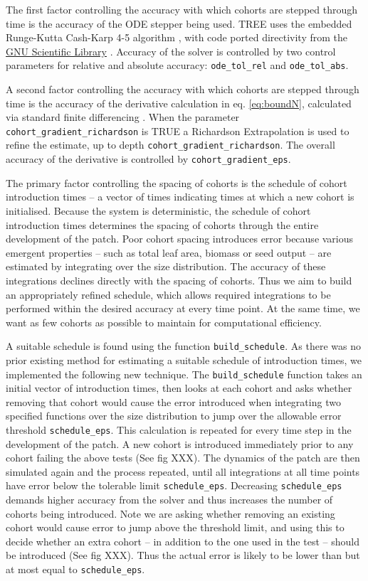 \documentclass[10pt,twoside]{article}
\begin{document}
The first factor controlling the accuracy with which cohorts are stepped
through time is the accuracy of the ODE stepper being used. TREE uses
the embedded Runge-Kutta Cash-Karp 4-5 algorithm \citep{Cash-1990}, with
code ported directivity from the
\href{http://www.gnu.org/software/gsl/}{GNU Scientific Library}
\citep{Galassi-2009}. Accuracy of the solver is controlled by two
control parameters for relative and absolute accuracy:
\texttt{ode\_tol\_rel} and \texttt{ode\_tol\_abs}.

A second factor controlling the accuracy with which cohorts are stepped
through time is the accuracy of the derivative calculation in eq.
\ref{eq:boundN}, calculated via standard finite differencing
\citep{Abramowitz-2012}. When the parameter
\texttt{cohort\_gradient\_richardson} is TRUE a Richardson Extrapolation
\citep{Stoer-2002} is used to refine the estimate, up to depth
\texttt{cohort\_gradient\_richardson}. The overall accuracy of the
derivative is controlled by \texttt{cohort\_gradient\_eps}.

The primary factor controlling the spacing of cohorts is the schedule of
cohort introduction times -- a vector of times indicating times at which
a new cohort is initialised. Because the system is deterministic, the
schedule of cohort introduction times determines the spacing of cohorts
through the entire development of the patch. Poor cohort spacing
introduces error because various emergent properties -- such as total
leaf area, biomass or seed output -- are estimated by integrating over
the size distribution. The accuracy of these integrations declines
directly with the spacing of cohorts. Thus we aim to build an
appropriately refined schedule, which allows required integrations to be
performed within the desired accuracy at every time point. At the same
time, we want as few cohorts as possible to maintain for computational
efficiency.

A suitable schedule is found using the function
\texttt{build\_schedule}. As there was no prior existing method for
estimating a suitable schedule of introduction times, we implemented the
following new technique. The \texttt{build\_schedule} function takes an
initial vector of introduction times, then looks at each cohort and asks
whether removing that cohort would cause the error introduced when
integrating two specified functions over the size distribution to jump
over the allowable error threshold \texttt{schedule\_eps}. This
calculation is repeated for every time step in the development of the
patch. A new cohort is introduced immediately prior to any cohort
failing the above tests (See fig XXX). The dynamics of the patch are
then simulated again and the process repeated, until all integrations at
all time points have error below the tolerable limit
\texttt{schedule\_eps}. Decreasing \texttt{schedule\_eps} demands higher
accuracy from the solver and thus increases the number of cohorts being
introduced. Note we are asking whether removing an existing cohort would
cause error to jump above the threshold limit, and using this to decide
whether an extra cohort -- in addition to the one used in the test --
should be introduced (See fig XXX). Thus the actual error is likely to
be lower than but at most equal to \texttt{schedule\_eps}.
\end{document}

